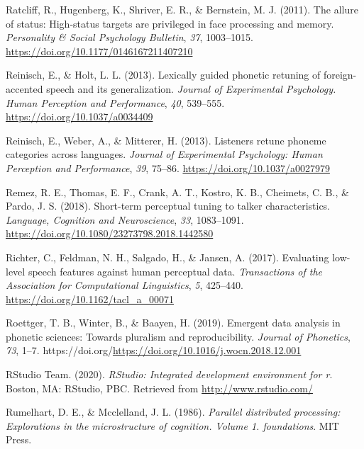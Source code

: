 \documentclass[
  11pt,
  english,
  man,floatsintext]{apa6}
\newlength{\cslhangindent}
\newlength{\cslentryspacingunit} %
\newenvironment{CSLReferences}[2] %
 {%
  \setlength{\parindent}{0pt}
  \ifodd #1
  \let\oldpar\par
  \def\par{\hangindent=\cslhangindent\oldpar}
  \fi
  \setlength{\parskip}{#2\cslentryspacingunit}
 }%
 {}
\begin{document}
\begin{CSLReferences}{1}{0}
\leavevmode{}%
Ratcliff, R., Hugenberg, K., Shriver, E. R., \& Bernstein, M. J. (2011). The allure of status: High-status targets are privileged in face processing and memory. \emph{Personality \& Social Psychology Bulletin}, \emph{37}, 1003--1015. \url{https://doi.org/10.1177/0146167211407210}

\leavevmode{}%
Reinisch, E., \& Holt, L. L. (2013). Lexically guided phonetic retuning of foreign-accented speech and its generalization. \emph{Journal of Experimental Psychology. Human Perception and Performance}, \emph{40}, 539--555. \url{https://doi.org/10.1037/a0034409}

\leavevmode{}%
Reinisch, E., Weber, A., \& Mitterer, H. (2013). Listeners retune phoneme categories across languages. \emph{Journal of Experimental Psychology: Human Perception and Performance}, \emph{39}, 75--86. \url{https://doi.org/10.1037/a0027979}

\leavevmode{}%
Remez, R. E., Thomas, E. F., Crank, A. T., Kostro, K. B., Cheimets, C. B., \& Pardo, J. S. (2018). Short-term perceptual tuning to talker characteristics. \emph{Language, Cognition and Neuroscience}, \emph{33}, 1083--1091. \url{https://doi.org/10.1080/23273798.2018.1442580}

\leavevmode{}%
Richter, C., Feldman, N. H., Salgado, H., \& Jansen, A. (2017). Evaluating low-level speech features against human perceptual data. \emph{Transactions of the Association for Computational Linguistics}, \emph{5}, 425--440. \url{https://doi.org/10.1162/tacl_a_00071}

\leavevmode{}%
Roettger, T. B., Winter, B., \& Baayen, H. (2019). Emergent data analysis in phonetic sciences: Towards pluralism and reproducibility. \emph{Journal of Phonetics}, \emph{73}, 1--7. https://doi.org/\url{https://doi.org/10.1016/j.wocn.2018.12.001}

\leavevmode{}%
RStudio Team. (2020). \emph{RStudio: Integrated development environment for r}. Boston, MA: RStudio, PBC. Retrieved from \url{http://www.rstudio.com/}

\leavevmode{}%
Rumelhart, D. E., \& Mcclelland, J. L. (1986). \emph{Parallel distributed processing: Explorations in the microstructure of cognition. Volume 1. foundations}. MIT Press.


\end{CSLReferences}
\end{document}
